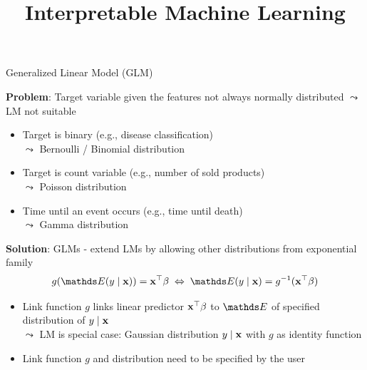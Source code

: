 \documentclass[11pt,compress,t,notes=noshow, aspectratio=169, xcolor=table]{beamer}
\title{Interpretable Machine Learning}
\date{}
\begin{document}
\newcommand{\titlefigure}{figure/whitebox}
\newcommand{\learninggoals}{
\item Definition of GLMs
\item Logistic regression as example
\item Interpretation in logistic regression
}



\begin{frame}{Generalized Linear Model (GLM)}

\textbf{Problem}: Target variable given the features not always normally distributed $\leadsto$ LM not suitable
\begin{itemize}
    \item Target is binary (e.g., disease classification)\\
    $\leadsto$ Bernoulli / Binomial distribution
    \item Target is count variable (e.g., number of sold products)\\
    $\leadsto$ Poisson distribution
    \item Time until an event occurs (e.g., time until death)\\
    $\leadsto$ Gamma distribution
\end{itemize}
\medskip
\pause
\textbf{Solution}: GLMs - extend LMs by allowing other distributions from exponential family
$$g(\E (y \mid \xv)) = \xv^\top \beta \; \Leftrightarrow \; \E (y \mid \xv) = g^{-1}(\xv^\top \beta)$$
\vspace*{-0.5cm}
    \begin{itemize}[<+->]
        \item Link function $g$ links linear predictor $\xv^\top \beta$ to $\E$ of specified distribution of $y \mid \xv$\\
        $\leadsto$ LM is special case: Gaussian distribution $y \mid \xv$ with $g$ as identity function 
        \item Link function $g$ and distribution need to be specified by the user

\end{itemize}
\end{frame}
\end{document}
